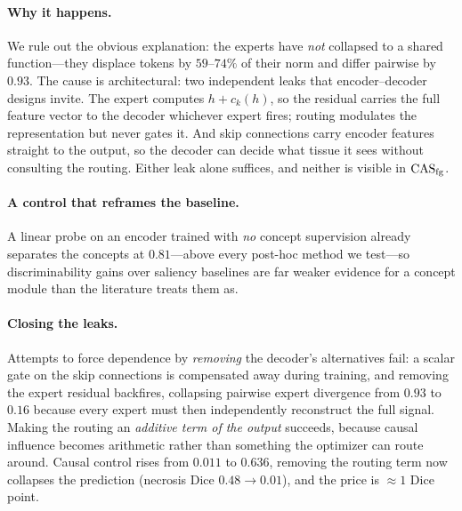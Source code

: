 \paragraph{Why it happens.}
We rule out the obvious explanation: the experts have \emph{not} collapsed to a shared
function---they displace tokens by $59$--$74\%$ of their norm and differ pairwise by $0.93$. The
cause is architectural: two independent leaks that encoder--decoder designs invite. The expert
computes $h + c_k(h)$, so the residual carries the full feature vector to the decoder whichever
expert fires; routing modulates the representation but never gates it. And skip connections carry
encoder features straight to the output, so the decoder can decide what tissue it sees without
consulting the routing. Either leak alone suffices, and neither is visible in $\mathrm{CAS}_{\mathrm{fg}}$.

\paragraph{A control that reframes the baseline.}
A linear probe on an encoder trained with \emph{no} concept supervision already separates the
concepts at $0.81$---above every post-hoc method we test---so discriminability gains over saliency
baselines are far weaker evidence for a concept module than the literature treats them as.

\paragraph{Closing the leaks.}
Attempts to force dependence by \emph{removing} the decoder's alternatives fail: a scalar gate on
the skip connections is compensated away during training, and removing the expert residual
backfires, collapsing pairwise expert divergence from $0.93$ to $0.16$ because every expert must
then independently reconstruct the full signal. Making the routing an \emph{additive term of the
output} succeeds, because causal influence becomes arithmetic rather than something the optimizer
can route around. Causal control rises from $0.011$ to $0.636$, removing the routing term now collapses the
prediction (necrosis Dice $0.48\!\to\!0.01$), and the price is ${\approx}1$ Dice point.

